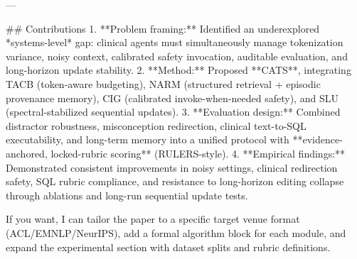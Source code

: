 ---

## Contributions  
1. **Problem framing:** Identified an underexplored *systems-level* gap: clinical agents must simultaneously manage tokenization variance, noisy context, calibrated safety invocation, auditable evaluation, and long-horizon update stability.  
2. **Method:** Proposed **CATS**, integrating TACB (token-aware budgeting), NARM (structured retrieval + episodic provenance memory), CIG (calibrated invoke-when-needed safety), and SLU (spectral-stabilized sequential updates).  
3. **Evaluation design:** Combined distractor robustness, misconception redirection, clinical text-to-SQL executability, and long-term memory into a unified protocol with **evidence-anchored, locked-rubric scoring** (RULERS-style).  
4. **Empirical findings:** Demonstrated consistent improvements in noisy settings, clinical redirection safety, SQL rubric compliance, and resistance to long-horizon editing collapse through ablations and long-run sequential update tests.

If you want, I can tailor the paper to a specific target venue format (ACL/EMNLP/NeurIPS), add a formal algorithm block for each module, and expand the experimental section with dataset splits and rubric definitions.